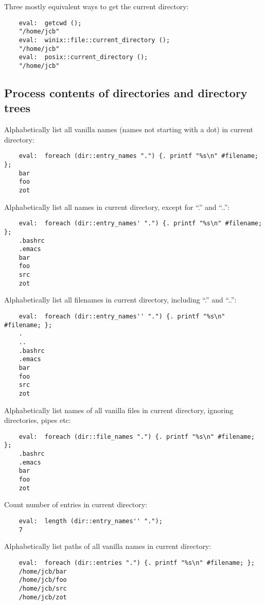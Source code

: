 Three mostly equivalent ways to get the current directory:
\begin{verbatim}
    eval:  getcwd ();
    "/home/jcb"
    eval:  winix::file::current_directory ();
    "/home/jcb"
    eval:  posix::current_directory ();
    "/home/jcb"
\end{verbatim}

\cutend*

\subsection{Process contents of directories and directory trees}

Alphabetically list all vanilla names 
(names not starting with a dot) in 
current directory:
\begin{verbatim}
    eval:  foreach (dir::entry_names ".") {. printf "%s\n" #filename; };
    bar
    foo
    zot
\end{verbatim}

Alphabetically list all names in current directory, except for ``.'' and ``..'':
\begin{verbatim}
    eval:  foreach (dir::entry_names' ".") {. printf "%s\n" #filename; };
    .bashrc
    .emacs
    bar
    foo
    src
    zot
\end{verbatim}

Alphabetically list all filenames in current directory, including ``.'' and ``..'':
\begin{verbatim}
    eval:  foreach (dir::entry_names'' ".") {. printf "%s\n" #filename; };
    .
    ..
    .bashrc
    .emacs
    bar
    foo
    src
    zot
\end{verbatim}

Alphabetically list names of all vanilla files in current directory, 
ignoring directories, pipes etc:
\begin{verbatim}
    eval:  foreach (dir::file_names ".") {. printf "%s\n" #filename; };
    .bashrc
    .emacs
    bar
    foo
    zot
\end{verbatim}

Count number of entries in current directory:
\begin{verbatim}
    eval:  length (dir::entry_names'' ".");
    7
\end{verbatim}

Alphabetically list paths of all vanilla names in current directory:
\begin{verbatim}
    eval:  foreach (dir::entries ".") {. printf "%s\n" #filename; };
    /home/jcb/bar
    /home/jcb/foo
    /home/jcb/src
    /home/jcb/zot
\end{verbatim}

